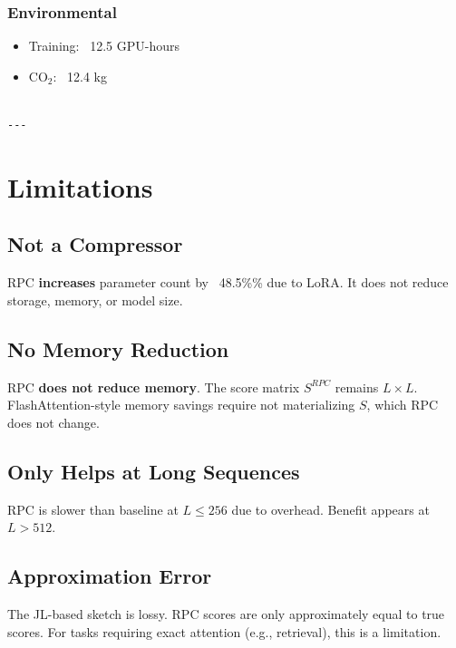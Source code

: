 \subsubsection{Environmental}
\begin{itemize}
\item Training: ~12.5 GPU-hours
\item CO$_2$: ~12.4 kg
\end{itemize}
\begin{lstlisting}

---
\end{lstlisting}


\section{Limitations}

\subsection{Not a Compressor}

RPC \textbf{increases} parameter count by ~48.5\%\% due to LoRA. It 
does not reduce storage, memory, or model size.

\subsection{No Memory Reduction}

RPC \textbf{does not reduce memory}. The score matrix $S^{RPC}$ remains $L \times L$. 
FlashAttention-style memory savings require not materializing $S$, which 
RPC does not change.

\subsection{Only Helps at Long Sequences}

RPC is slower than baseline at $L \leq 256$ due to overhead. Benefit appears 
at $L > 512$.

\subsection{Approximation Error}

The JL-based sketch is lossy. RPC scores are only approximately equal to 
true scores. For tasks requiring exact attention (e.g., retrieval), this 
is a limitation.

